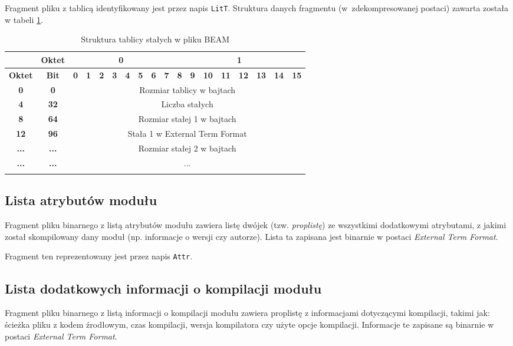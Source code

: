 Fragment pliku z tablicą identyfikowany jest przez napis \texttt{LitT}. Struktura danych fragmentu (w~zdekompresowanej postaci) zawarta została w tabeli \ref{table:literaltable}.

\begin{longtable}{|c|c|c|c|c|c|c|c|c|c|c|c|c|c|c|c|c|c|}
\hline
         & \textbf{Oktet} & \multicolumn{8}{|c|}{\textbf{0}} & \multicolumn{8}{|c|}{\textbf{1}} \\
\hline
\textbf{Oktet} & \textbf{Bit} & \textbf{0} & \textbf{1} & \textbf{2} & \textbf{3} & \textbf{4} & \textbf{5} & \textbf{6} & \textbf{7} & \textbf{8} & \textbf{9} & \textbf{10} & \textbf{11} & \textbf{12} & \textbf{13} & \textbf{14} & \textbf{15}\\
\hline
\textbf{0} & \textbf{0} & \multicolumn{16}{|c|}{Rozmiar tablicy w bajtach} \\[3ex]
\hline
\textbf{4} & \textbf{32} & \multicolumn{16}{|c|}{Liczba stałych}\\[3ex]
\hline
\textbf{8} & \textbf{64} & \multicolumn{16}{|c|}{Rozmiar stałej 1 w bajtach} \\[3ex]
\hline
\textbf{12} & \textbf{96} & \multicolumn{16}{|c|}{Stała 1 w External Term Format}\\[8ex]
\hline
\textbf{...} & \textbf{...} & \multicolumn{16}{|c|}{Rozmiar stałej 2 w bajtach}\\[3ex]
\hline
\textbf{...} & \textbf{...} & \multicolumn{16}{|c|}{...}\\[8ex]
\hline
\caption{Struktura tablicy stałych w pliku BEAM}
\label{table:literaltable} \\
\end{longtable}

\subsection{Lista atrybutów modułu}
Fragment pliku binarnego z listą atrybutów modułu zawiera listę dwójek (tzw. \emph{proplistę}) ze wszystkimi dodatkowymi atrybutami, z jakimi został skompilowany dany moduł (np. informacje o wersji czy autorze). Lista ta zapisana jest binarnie w postaci \emph{External Term Format}.

Fragment ten reprezentowany jest przez napis \texttt{Attr}.

\subsection{Lista dodatkowych informacji o kompilacji modułu}
Fragment pliku binarnego z listą informacji o kompilacji modułu zawiera proplistę z informacjami dotyczącymi kompilacji, takimi jak: ścieżka pliku z kodem źrodłowym, czas kompilacji, wersja kompilatora czy użyte opcje kompilacji. Informacje te zapisane są binarnie w postaci \emph{External Term Format}.

